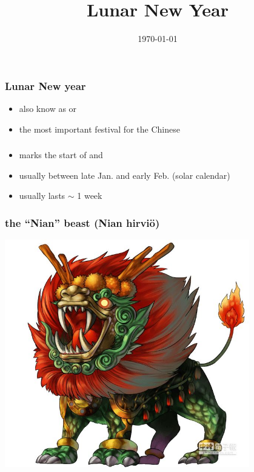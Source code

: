 \documentclass[17pt]{beamer}
\title{Lunar New Year}
\date{\today}
\begin{document}
\frame{\titlepage}


\begin{frame}
  \frametitle{Lunar New year}

  \begin{itemize}
  \item also know as  or 
  \item the most important festival for the Chinese
  \end{itemize}
\end{frame}


\begin{frame}
  \frametitle{}

  \begin{itemize}
  \item marks the start of  and 
  \item usually between late Jan. and early Feb. (solar calendar)
  \item usually lasts $\sim$ 1 week
  \end{itemize}
\end{frame}


\begin{frame}
  \frametitle{the ``Nian'' beast (Nian hirviö)}

  \begin{center}
    \includegraphics[width=0.8\textwidth]{./images/nian}
  \end{center}
\end{frame}
\end{document}
